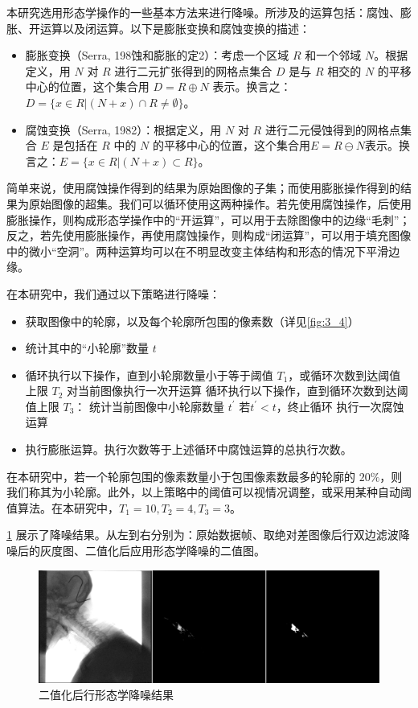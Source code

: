本研究选用形态学操作的一些基本方法来进行降噪。所涉及的运算包括：腐蚀、膨胀、开运算以及闭运算。以下是膨胀变换和腐蚀变换的描述：
\begin{itemize}
    \item 膨胀变换（Serra, 198蚀和膨胀的定2\cite{serra1982image}）：考虑一个区域 $R$ 和一个邻域 $N$。根据定义，用 $N$ 对 $R$ 进行二元扩张得到的网格点集合 $D$ 是与 $R$ 相交的 $N$ 的平移中心的位置，这个集合用 $D=R \oplus N$ 表示。换言之：$D=\{x \in R |(N+x) \cap R \neq \emptyset\}$。
    \item 腐蚀变换（Serra, 1982\cite{serra1982image}）：根据定义，用 $N$ 对 $R$ 进行二元侵蚀得到的网格点集合 $E$ 是包括在 $R$ 中的 $N$ 的平移中心的位置，这个集合用$E=R \ominus N$表示。换言之：$E=\{x \in R |(N+x) \subset R\}$。
\end{itemize}
简单来说，使用腐蚀操作得到的结果为原始图像的子集；而使用膨胀操作得到的结果为原始图像的超集。我们可以循环使用这两种操作。若先使用腐蚀操作，后使用膨胀操作，则构成形态学操作中的“开运算”，可以用于去除图像中的边缘“毛刺”；反之，若先使用膨胀操作，再使用腐蚀操作，则构成“闭运算”，可以用于填充图像中的微小“空洞”。两种运算均可以在不明显改变主体结构和形态的情况下平滑边缘。

在本研究中，我们通过以下策略进行降噪：
\begin{itemize}
    \item 获取图像中的轮廓，以及每个轮廓所包围的像素数（详见\cref{fig:3_4}）
    \item 统计其中的“小轮廓”数量 $t$
    \item 循环执行以下操作，直到小轮廓数量小于等于阈值 $T_1$，或循环次数到达阈值上限 $T_2$
    \subitem 对当前图像执行一次开运算
    \subitem 循环执行以下操作，直到循环次数到达阈值上限 $T_3$：
    \subsubitem 统计当前图像中小轮廓数量 $t^{\prime}$
    \subsubitem 若$t^{\prime} < t$，终止循环
    \subsubitem 执行一次腐蚀运算
    \item 执行膨胀运算。执行次数等于上述循环中腐蚀运算的总执行次数。
\end{itemize}

在本研究中，若一个轮廓包围的像素数量小于包围像素数最多的轮廓的 $20\%$，则我们称其为小轮廓。此外，以上策略中的阈值可以视情况调整，或采用某种自动阈值算法。在本研究中，$T_1=10, T_2=4, T_3=3$。

\cref{fig:3_3_形态学} 展示了降噪结果。从左到右分别为：原始数据帧、取绝对差图像后行双边滤波降噪后的灰度图、二值化后应用形态学降噪的二值图。

\begin{figure}[!htp]
    \centering
    \includegraphics[width=\textwidth]{figures/3_3.png}
    \caption{二值化后行形态学降噪结果}
    \label{fig:3_3_形态学}
\end{figure}

